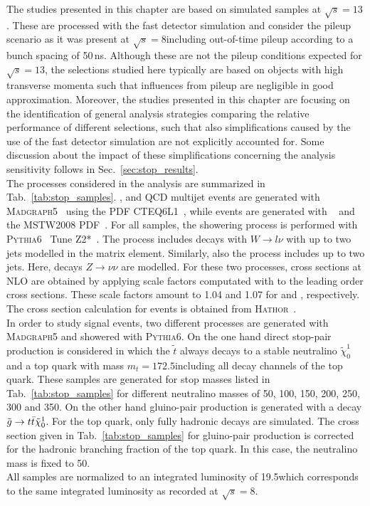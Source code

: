 The studies presented in this chapter are based on simulated samples at $\sqrt{s} = 13$\tev. These are processed with the fast detector simulation and consider the pileup scenario as it was present at $\sqrt{s} = 8$\tev including out-of-time pileup according to a bunch spacing of 50\,ns. Although these are not the pileup conditions expected for $\sqrt{s} = 13$\tev, the selections studied here typically are based on objects with high transverse momenta such that influences from pileup are negligible in good approximation. Moreover, the studies presented in this chapter are focusing on the identification of general analysis strategies comparing the relative performance of different selections, such that also simplifications caused by the use of the fast detector simulation are not explicitly accounted for. Some discussion about the impact of these simplifications concerning the analysis sensitivity follows in Sec.~\ref{sec:stop_results}.  \\
The processes considered in the analysis are summarized in Tab.~\ref{tab:stop_samples}. \WJets, \ZJets and QCD multijet events are generated with \textsc{Madgraph5}~\cite{Alwall:2007st} using the PDF CTEQ6L1~\cite{Pumplin:2002vw}, while \ttbar events are generated with \powheg~\cite{Oleari:2010nx} and the MSTW2008 PDF~\cite{Martin:2009iq}. For all samples, the showering process is performed with \textsc{Pythia6}~\cite{Sjostrand:2006za} Tune Z2*~\cite{Chatrchyan:2013gfi}. The process \WJets includes decays with $W \rightarrow l \nu$ with up to two jets modelled in the matrix element. Similarly, also the process \ZJets includes up to two jets. Here, decays $Z \rightarrow \nu \nu$ are modelled. For these two processes, cross sections at NLO are obtained by applying scale factors computated with \powheg to the leading order cross sections. These scale factors amount to 1.04 and 1.07 for \WJets and \ZJets, respectively. The cross section calculation for \ttbar events is obtained from \textsc{Hathor}~\cite{Aliev:2010zk}. \\
In order to study signal events, two different processes are generated with \textsc{Madgraph5} and showered with \textsc{Pythia6}. On the one hand direct stop-pair production is considered in which the $\tilde{t}$ always decays to a stable neutralino $\tilde{\chi}_{0}^{1}$ and a top quark with mass $m_{t} = 172.5$\gev including all decay channels of the top quark. These samples are generated for stop masses listed in Tab.~\ref{tab:stop_samples} for different neutralino masses of 50, 100, 150, 200, 250, 300 and 350\gev. On the other hand gluino-pair production is generated with a decay $\tilde{g} \rightarrow t\bar{t} \tilde{\chi}_{0}^{1}$. For the top quark, only fully hadronic decays are simulated. The cross section given in Tab.~\ref{tab:stop_samples} for gluino-pair production is corrected for the hadronic branching fraction of the top quark. In this case, the neutralino mass is fixed to 50\gev. \\
All samples are normalized to an integrated luminosity of 19.5\fbinv which corresponds to the same integrated luminosity as recorded at $\sqrt{s} =8$\tev.

